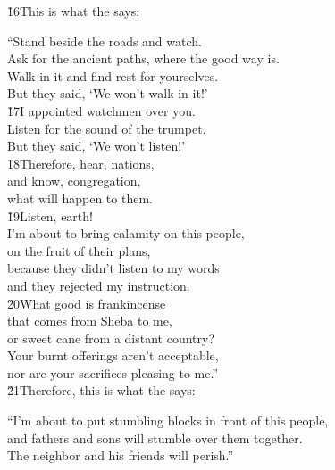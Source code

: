 \v{16}This is what the  says:

\begin{poetry}
\poeml ``Stand beside the roads and watch. \\
\poemll    Ask for the ancient paths, where the good way is. \\
\poeml Walk in it and find rest for yourselves. \\
\poemll    But they said, `We won't walk in it!' \\
\poeml \v{17}I appointed watchmen over you. \\
\poemll    Listen for the sound of the trumpet. \\
\poeml But they said, `We won't listen!' \\
\poeml \v{18}Therefore, hear, nations, \\
\poemll    and know, congregation, \\
\poemlll       what will happen to them. \\
\poeml \v{19}Listen, earth! \\
\poemll    I'm about to bring calamity on this people, \\
\poemlll       on the fruit of their plans, \\
\poeml because they didn't listen to my words \\
\poemll    and they rejected my instruction. \\
\poeml \v{20}What good is frankincense \\
\poemll    that comes from Sheba to me, \\
\poemlll       or sweet cane from a distant country? \\
\poeml Your burnt offerings aren't acceptable, \\
\poemll    nor are your sacrifices pleasing to me.'' \\
\poeml \v{21}Therefore, this is what the  says:
\end{poetry}

\begin{poetry}
\poeml ``I'm about to put stumbling blocks in front of this people, \\
\poemll    and fathers and sons will stumble over them together. \\
\poemlll       The neighbor and his friends will perish.''
\end{poetry}


